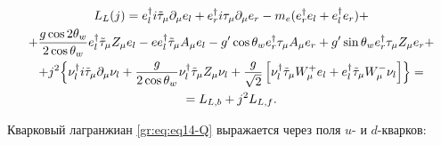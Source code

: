 \begin{multline}

L_L(j)=e_l^{\dagger}i\tilde{\tau}_{\mu}\partial_{\mu}e_l +

e_r^{\dagger}i\tau_{\mu}\partial_{\mu}e_r

-m_e(e_r^{\dagger}e_l + e_l^{\dagger} e_r)+

\\

+\frac{g\cos 2\theta_w}{2\cos \theta_w}e_l^{\dagger}\tilde{\tau}_{\mu}Z_{\mu}e_l

-ee_l^{\dagger}\tilde{\tau}_{\mu}A_{\mu}e_l %



-g'\cos \theta_w e_r^{\dagger}\tau_{\mu}A_{\mu}e_r +

 g'\sin \theta_w e_r^{\dagger}\tau_{\mu}Z_{\mu}e_r +

\\

+j^2\Bigl\{ \nu_l^{\dagger}i\tilde{\tau}_{\mu}\partial_{\mu}\nu_l

 +

 \frac{g}{2\cos \theta_w} \nu_l^{\dagger}\tilde{\tau}_{\mu}Z_{\mu}\nu_l 


+\frac{g}{\sqrt{2}}\left[ \nu_l^{\dagger}\tilde{\tau}_{\mu}W_{\mu}^{+}e_l +

 e_l^{\dagger}\tilde{\tau}_{\mu}W_{\mu}^{-}\nu_l\right]\Bigr\}= 

\\

 =L_{L,b}+ j^2L_{L,f}.

\label{gr:eq:g15-4}

\end{multline}




Кварковый лагранжиан \eqref{gr:eq:eq14-Q} выражается через поля  $u$- и $d$-кварков:

